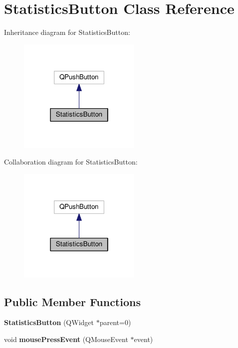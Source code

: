 \hypertarget{class_statistics_button}{}\section{Statistics\+Button Class Reference}
\label{class_statistics_button}


Inheritance diagram for Statistics\+Button\+:
\nopagebreak
\begin{figure}[H]
\begin{center}
\leavevmode
\includegraphics[width=166pt]{class_statistics_button__inherit__graph}
\end{center}
\end{figure}


Collaboration diagram for Statistics\+Button\+:
\nopagebreak
\begin{figure}[H]
\begin{center}
\leavevmode
\includegraphics[width=166pt]{class_statistics_button__coll__graph}
\end{center}
\end{figure}
\subsection*{Public Member Functions}
\begin{DoxyCompactItemize}
\item 
{\bfseries Statistics\+Button} (Q\+Widget $\ast$parent=0)\hypertarget{class_statistics_button_ac69b87576f5d88de9d7be2da4694600f}{}\label{class_statistics_button_ac69b87576f5d88de9d7be2da4694600f}

\item 
void {\bfseries mouse\+Press\+Event} (Q\+Mouse\+Event $\ast$event)\hypertarget{class_statistics_button_a52c7ea98fea0ef203783e57fc96fa9a5}{}\label{class_statistics_button_a52c7ea98fea0ef203783e57fc96fa9a5}

\end{DoxyCompactItemize}



